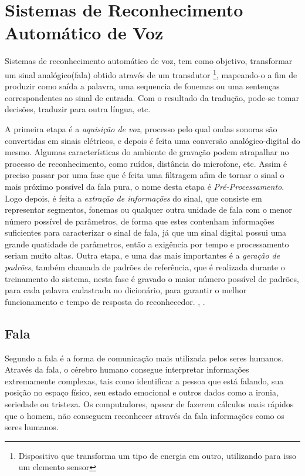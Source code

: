 \chapter{Sistemas de Reconhecimento Automático de Voz}

Sistemas de reconhecimento automático de voz, tem como objetivo, transformar um sinal analógico(fala) obtido através de um transdutor \footnote{Dispositivo que transforma um tipo de energia em outro, utilizando para isso um elemento sensor}, mapeando-o a fim de produzir como saída a palavra, uma sequencia de fonemas ou uma sentenças correspondentes ao sinal de entrada. Com o resultado da tradução, pode-se tomar decisões, traduzir para outra língua, etc.

A primeira etapa é a \textit{aquisição de voz}, processo pelo qual ondas sonoras são convertidas em sinais elétricos, e depois é feita uma conversão analógico-digital do mesmo. Algumas características do ambiente de gravação podem atrapalhar no processo de reconhecimento, como ruídos, distância do microfone, etc. Assim é preciso passar por uma fase que é feita uma filtragem afim de tornar o sinal o mais próximo possível da fala pura, o nome desta etapa é \textit{Pré-Processamento}. Logo depois, é feita a \textit{extração de informações} do sinal, que consiste em representar segmentos, fonemas ou qualquer outra unidade de fala com o menor número possível de parâmetros, de forma que estes contenham informações suficientes para caracterizar o sinal de fala, já que um sinal digital possui uma grande quatidade de parâmetros, então a exigência por tempo e processamento seriam muito altas. Outra etapa, e uma das mais importantes é a \textit{geração de padrões}, também chamada de padrões de referência, que é realizada durante o treinamento do sistema, nesta fase é gravado o maior número possível de padrões, para cada palavra cadastrada no dicionário, para garantir o melhor funcionamento e tempo de resposta do reconhecedor.
\cite{RavIsolAnderson}, \cite{RavComputLouzada}. 


\section{Fala}
Segundo  a fala é a forma de comunicação mais utilizada pelos seres humanos. Através da fala, o cérebro humano consegue interpretar informações extremamente complexas, tais como identificar a pessoa que está falando, sua posição no espaço físico, seu estado emocional e outros dados como a ironia, seriedade ou tristeza. Os computadores, apesar de fazerem cálculos mais rápidos que o homem, não conseguem reconhecer através da fala informações como os seres humanos.

